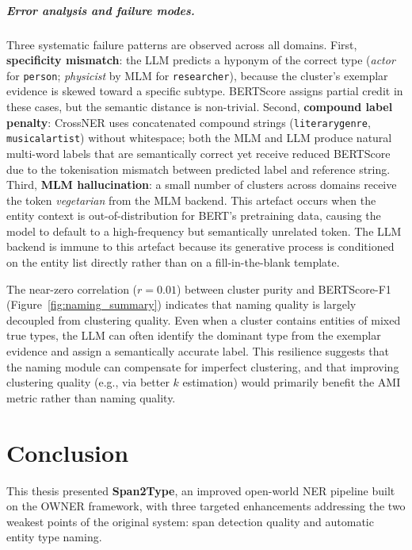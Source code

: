 \documentclass[14pt]{extreport}
\begin{document}
\paragraph{Error analysis and failure modes.}
Three systematic failure patterns are observed across all domains. First, \textbf{specificity mismatch}: the LLM predicts a hyponym of the correct type (\textit{actor} for \texttt{person}; \textit{physicist} by MLM for \texttt{researcher}), because the cluster's exemplar evidence is skewed toward a specific subtype. BERTScore assigns partial credit in these cases, but the semantic distance is non-trivial. Second, \textbf{compound label penalty}: CrossNER uses concatenated compound strings (\texttt{literarygenre}, \texttt{musicalartist}) without whitespace; both the MLM and LLM produce natural multi-word labels that are semantically correct yet receive reduced BERTScore due to the tokenisation mismatch between predicted label and reference string. Third, \textbf{MLM hallucination}: a small number of clusters across domains receive the token \textit{vegetarian} from the MLM backend. This artefact occurs when the entity context is out-of-distribution for BERT's pretraining data, causing the model to default to a high-frequency but semantically unrelated token. The LLM backend is immune to this artefact because its generative process is conditioned on the entity list directly rather than on a fill-in-the-blank template.

The near-zero correlation ($r{=}0.01$) between cluster purity and BERTScore-F1 (Figure~\ref{fig:naming_summary}) indicates that naming quality is largely decoupled from clustering quality. Even when a cluster contains entities of mixed true types, the LLM can often identify the dominant type from the exemplar evidence and assign a semantically accurate label. This resilience suggests that the naming module can compensate for imperfect clustering, and that improving clustering quality (e.g., via better $k$ estimation) would primarily benefit the AMI metric rather than naming quality.

\chapter{Conclusion}\label{sec:Con}

This thesis presented \textbf{Span2Type}, an improved open-world NER pipeline built on the OWNER framework, with three targeted enhancements addressing the two weakest points of the original system: span detection quality and automatic entity type naming.
\end{document}
